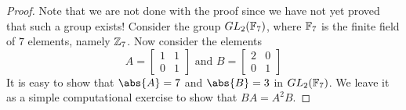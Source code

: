 \begin{proof}
    Note that we are not done with the proof since we have not yet proved that such a group exists! Consider the group $GL_2(\mathbb{F}_7)$, where $\mathbb{F}_7$ is the finite field of $7$ elements, namely $\mathbb{Z}_7$. Now consider the elements
    \[
        A = \begin{bmatrix}
            1 & 1 \\
            0 & 1
        \end{bmatrix} \text{ and } B = \begin{bmatrix}
            2 & 0 \\
            0 & 1
        \end{bmatrix}
    \]
    It is easy to show that $\abs{A} = 7$ and $\abs{B} = 3$ in $GL_2(\mathbb{F}_7)$. We leave it as a simple computational exercise to show that $BA = A^2B$.
\end{proof}

